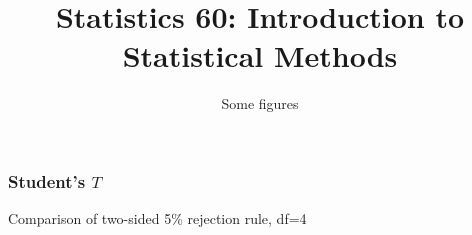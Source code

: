 \documentclass[handout]{beamer}
\title{Statistics 60: Introduction to Statistical Methods}
\subtitle{Some figures}
\author{}%
\begin{document}
   \begin{frame}
   \titlepage
   \end{frame}



   \begin{frame}
   \frametitle{Student's $T$}
   \begin{center}
   \end{center}
   Comparison of two-sided {\color{blue} 5\% rejection rule}, df=4
   \end{frame}
\end{document}
